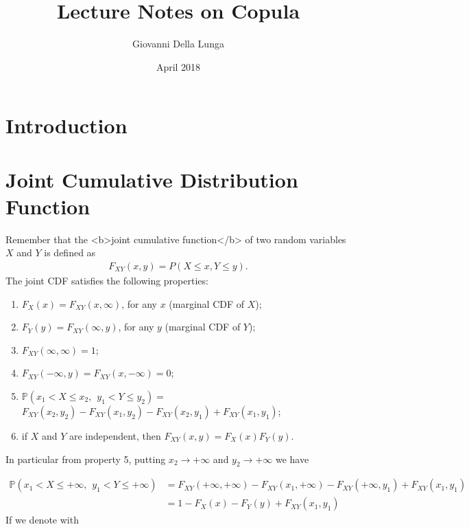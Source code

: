 \documentclass{article}
\title{Lecture Notes on Copula}
\author{Giovanni Della Lunga}
\date{April 2018}
\begin{document}
\maketitle
%
%
\section{Introduction}
%
%
\section{Joint Cumulative Distribution Function }
Remember that the <b>joint cumulative function</b> of two random variables $X$ and $Y$ is defined as
\begin{align}%
\nonumber F_{XY}(x,y)=P(X \leq x, Y \leq y).
\end{align}
The joint CDF satisfies the following properties:

\begin{enumerate}
  \item  $F_X(x)=F_{XY}(x, \infty)$, for any $x$ (marginal CDF of $X$);
	\item  $F_Y(y)=F_{XY}(\infty,y)$, for any $y$ (marginal CDF of $Y$);
  \item  $F_{XY}(\infty, \infty)=1$;
  \item  $F_{XY}(-\infty, y)=F_{XY}(x,-\infty)=0$;
	\item 
   $\mathbb{P}(x_1 < X \leq x_2, \hspace{5pt} y_1  <Y \leq y_2)=$
     $F_{XY}(x_2,y_2)-F_{XY}(x_1,y_2)-F_{XY}(x_2,y_1)+F_{XY}(x_1,y_1)$;
	
  \item if $X$ and $Y$ are independent, then $F_{XY}(x,y)=F_X(x)F_Y(y)$.
\end{enumerate}

\noindent In particular from property 5, putting $x_2 \rightarrow +\infty$ and $y_2 \rightarrow +\infty$ we have

\begin{align}
\mathbb{P}(x_1 < X \leq +\infty, \hspace{5pt} y_1  <Y \leq +\infty) & =
     F_{XY}(+\infty,+\infty)-F_{XY}(x_1,+\infty)-F_{XY}(+\infty,y_1)+F_{XY}(x_1,y_1) \\
& = 1 - F_X(x) - F_Y(y) + F_{XY}(x_1,y_1)     
\end{align}
If we denote with 
\end{document}
